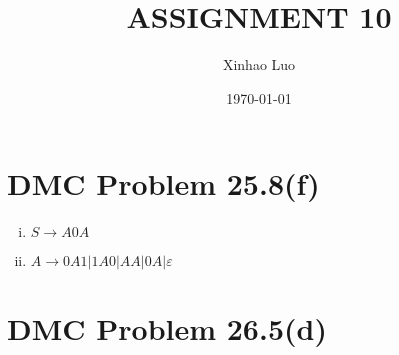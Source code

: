 \documentclass{article}
\title{\bf \Large ASSIGNMENT 10}
\author{Xinhao Luo}
\date{\today}
\def\math#1{$#1$}
\begin{document}
\maketitle
\medskip

\section{DMC Problem 25.8(f)}
\begin{enumerate}[i)]
    \item \math{S \to A0A}
    \item \math{A \to 0A1\vert 1A0\vert AA \vert 0A \vert \varepsilon}
\end{enumerate}

\section{DMC Problem 26.5(d)}
\end{document}
